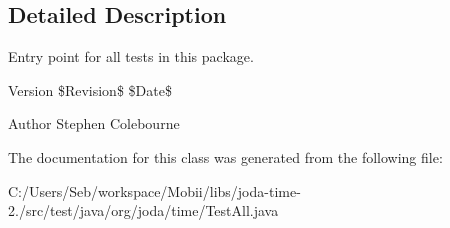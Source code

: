 \subsection{Detailed Description}
Entry point for all tests in this package.

\begin{DoxyVersion}{Version}
\$\-Revision\$ \$\-Date\$
\end{DoxyVersion}
\begin{DoxyAuthor}{Author}
Stephen Colebourne 
\end{DoxyAuthor}


The documentation for this class was generated from the following file\-:\begin{DoxyCompactItemize}
\item 
C\-:/\-Users/\-Seb/workspace/\-Mobii/libs/joda-\/time-\/2./src/test/java/org/joda/time/Test\-All.\-java\end{DoxyCompactItemize}
